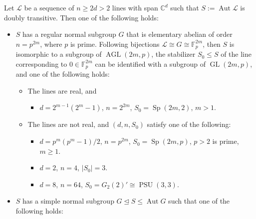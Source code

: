 \begin{theorem}
\label{thm:classification}
Let $\mathscr{L}$ be a sequence of $n\geq 2d > 2$ lines with span $\mathbb{C}^d$ such that $S := \operatorname{Aut} \mathscr{L}$ is doubly transitive.
Then one of the following holds:
\begin{itemize}
\item[(I)]
$S$ has a regular normal subgroup $G$ that is elementary abelian of order $n = p^{2m}$, where $p$ is prime.
Following bijections $\mathscr{L} \cong G \cong \mathbb{F}_p^{2m}$, then $S$ is isomorphic to a subgroup of $\operatorname{AGL}(2m,p)$, the stabilizer $S_0 \leq S$ of the line corresponding to $0 \in \mathbb{F}_p^{2m}$ can be identified with
a subgroup of $\operatorname{GL}(2m,p)$, and one of the following holds:

	\begin{itemize}
	\item[(A)]
	The lines are real, and
		\begin{itemize}
		\item[(i)]
		$d = 2^{m-1}(2^m - 1)$, $n = 2^{2m}$, $S_0 = \operatorname{Sp}(2m,2)$, $m > 1$.
		\end{itemize}
	
	\item[(B)]
	The lines are not real, and $(d,n,S_0)$ satisfy one of the following:
		\begin{itemize}
		\item[(ii)]
		$d = p^m(p^m-1)/2$, $n=p^{2m}$, $S_0=\operatorname{Sp}(2m,p)$, $p>2$ is prime, $m \geq 1$.
		\item[(iii)]
		$d = 2$, $n=4$, $|S_0|=3$.
		\item[(iv)]
		$d = 8$, $n = 64$, $S_0=G_2(2)'\cong\operatorname{PSU}(3,3)$.
		\end{itemize}
	
	\end{itemize}
	
\item[(II)]
$S$ has a simple normal subgroup $G \unlhd S \leq \operatorname{Aut} G$ such that one of the following holds:


\end{itemize}
\end{theorem}
